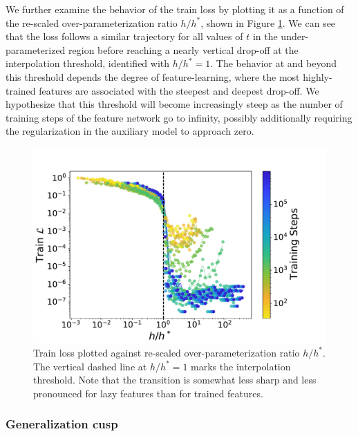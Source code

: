 \documentclass[11pt]{article}
\begin{document}
We further examine the behavior of the train loss by plotting it as a function of the re-scaled over-parameterization ratio $h/h^*$, shown in Figure \ref{h/h_star_vs_train_loss_log}. We can see that the loss follows a similar trajectory for all values of $t$ in the under-parameterized region before reaching a nearly vertical drop-off at the interpolation threshold, identified with $h/h^*=1$. The behavior at and beyond this threshold depends the degree of feature-learning, where the most highly-trained features are associated with the steepest and deepest drop-off. We hypothesize that this threshold will become increasingly steep as the number of training steps of the feature network go to infinity, possibly additionally requiring the regularization in the auxiliary model to approach zero. \\

\begin{figure}[!h]
\centering
\captionsetup{width=.8\linewidth}
\centering
\includegraphics[width=.8\linewidth]{docs/assets/h_h_star_vs_train_loss_L=1_log.pdf}
\caption{Train loss plotted against re-scaled over-parameterization ratio $h/h^*$. The vertical dashed line at $h/h^*=1$ marks the interpolation threshold. Note that the transition is somewhat less sharp and less pronounced for lazy features than for trained features.}
\label{h/h_star_vs_train_loss_log}
\end{figure}

\subsubsection{Generalization cusp}
\end{document}
